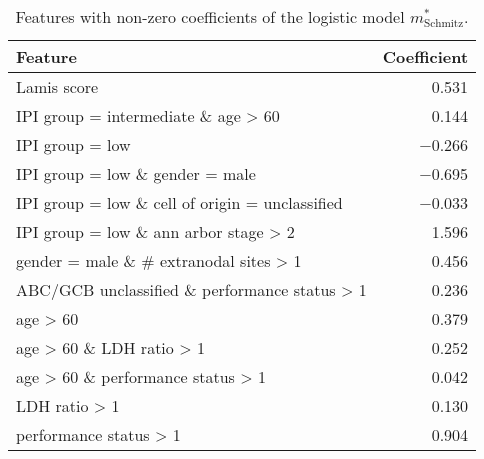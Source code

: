 \begin{table}[ht]
    \centering
    \small
    \begin{tabular}{lr}
        \hline
        \textbf{Feature} & \textbf{Coefficient} \\
        \hline
        Lamis score & \num{0.531} \\
        IPI group = intermediate \& age > 60 & \num{0.144} \\
        IPI group = low & \num{-0.266} \\
        IPI group = low \& gender = male & \num{-0.695} \\
        IPI group = low \& cell of origin = unclassified & \num{-0.033} \\
        IPI group = low \& ann arbor stage > 2 & \num{1.596} \\
        gender = male \& \# extranodal sites > 1 & \num{0.456} \\
        ABC/GCB unclassified \& performance status > 1 & \num{0.236} \\
        age > 60 & \num{0.379} \\
        age > 60 \& LDH ratio > 1 & \num{0.252} \\
        age > 60 \& performance status > 1 & \num{0.042} \\
        LDH ratio > 1 & \num{0.130} \\
        performance status > 1 & \num{0.904} \\
        \hline
    \end{tabular}
    \caption{Features with non-zero coefficients of the logistic model 
        $m^*_\text{Schmitz}$.}
\end{table}